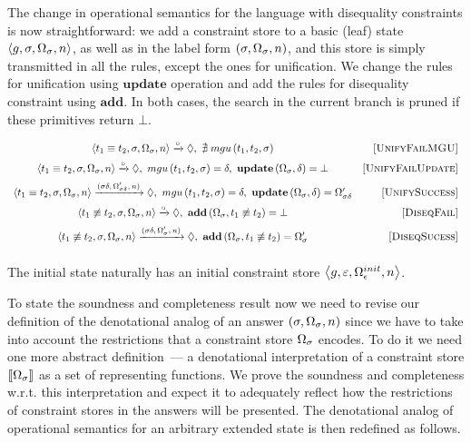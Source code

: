 The change in operational semantics for the language with disequality constraints is now straightforward: we add a constraint store to a basic (leaf) state $\left<{g, \sigma, \Omega_\sigma, n}\right>$, as well as in the label form $(\sigma, \Omega_\sigma, n)$, and this store is simply transmitted in all the rules, except the ones for unification. We change the rules for unification using $\mathbf{update}$ operation and add the rules for disequality constraint using $\mathbf{add}$. In both cases, the search in the current branch is pruned if these primitives return $\bot$.

 \[
  \begin{array}{cr}
    \left<{t_1 \equiv t_2, \sigma, \Omega_\sigma, n}\right> \xrightarrow{\circ} \Diamond , \, \, \nexists\; mgu\,(t_1, t_2, \sigma) &\mbox{[\textsc{UnifyFailMGU}]} \\[2mm]
    \left<{t_1 \equiv t_2, \sigma, \Omega_\sigma, n}\right> \xrightarrow{\circ} \Diamond , \, \, mgu\,(t_1, t_2, \sigma) = \delta, \, \, \mathbf{update}\,(\Omega_\sigma, \delta) = \bot &\mbox{[\textsc{UnifyFailUpdate}]} \\[2mm]
    \left<{t_1 \equiv t_2, \sigma, \Omega_\sigma, n}\right> \xrightarrow{(\sigma \delta, \, \Omega'_{\sigma\delta}, \, n)} \Diamond , \, \, mgu\,(t_1, t_2, \sigma) = \delta, \, \, \mathbf{update}\,(\Omega_\sigma, \delta) = \Omega'_{\sigma\delta} & \mbox{[\textsc{UnifySuccess}]} \\[2mm]
    \left<{t_1 \not\equiv t_2, \sigma, \Omega_\sigma, n}\right> \xrightarrow{\circ} \Diamond , \, \, \mathbf{add}\,(\Omega_\sigma, t_1 \not\equiv t_2) = \bot &\mbox{[\textsc{DiseqFail}]} \\[2mm]
    \left<{t_1 \not\equiv t_2, \sigma, \Omega_\sigma, n}\right> \xrightarrow{(\sigma \delta, \, \Omega'_{\sigma}, \, n)} \Diamond , \, \, \mathbf{add}\,(\Omega_\sigma, t_1 \not\equiv t_2) = \Omega'_\sigma &\mbox{[\textsc{DiseqSucess}]} \\[2mm]
  \end{array}
\]

The initial state naturally has an initial constraint store $\left<{g, \varepsilon, \Omega_\epsilon^{init}, n}\right>$.

To state the soundness and completeness result now we need to revise our definition of the denotational analog of an answer $(\sigma, \Omega_\sigma, n)$
since we have to take into account the restrictions that a constraint store $\Omega_\sigma$ encodes.
To do it we need one more abstract definition~--- a denotational interpretation of a constraint store $\llbracket{\Omega_\sigma}\rrbracket$ as a set of representing functions.
We prove the soundness and completeness w.r.t. this interpretation and expect it to adequately reflect how the restrictions of constraint stores in the answers will be presented.
The denotational analog of operational semantics for an arbitrary extended state is then redefined as follows.

